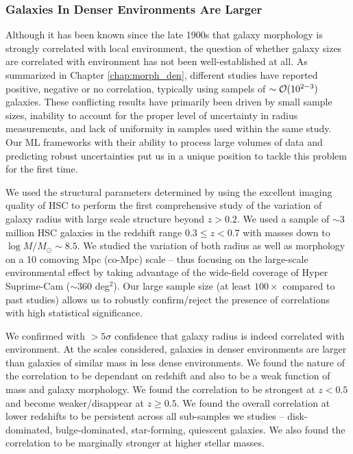 \subsubsection{Galaxies In Denser Environments Are Larger} \label{sec_conc:morph_den} 

Although it has been known since the late 1900s that galaxy morphology is strongly correlated with local environment, the question of whether galaxy sizes are correlated with environment has not been well-established at all. As summarized in Chapter \ref{chap:morph_den}, different studies have reported positive, negative or no correlation, typically using sampels of $\sim \mathcal{O}(10^{2-3})$ galaxies. These conflicting results have primarily been driven by small sample sizes, inability to account for the proper level of uncertainty in radius measurements, and lack of uniformity in samples used within the same study. Our ML frameworks with their ability to process large volumes of data and predicting robust uncertainties put us in a unique position to tackle this problem for the first time. 

We used the structural parameters determined by \gampen{} using the excellent imaging quality of HSC to perform the first comprehensive study of the variation of galaxy radius with large scale structure beyond $z > 0.2$. We used a sample of $\sim3$ million HSC galaxies in the redshift range $0.3 \leq z < 0.7$ with masses down to $\log M/M_{\odot}\sim8.5$. We studied the variation of both radius as well as morphology on a 10 comoving Mpc (co-Mpc) scale -- thus focusing on the large-scale environmental effect by taking advantage of the wide-field coverage of Hyper Suprime-Cam ($\sim 360$ deg$^2$). Our large sample size (at least $100\times$ compared to past studies) allows us to robustly confirm/reject the presence of correlations with high statistical significance. 

We confirmed with $>5\sigma$ confidence that galaxy radius is indeed correlated with environment. At the scales considered, galaxies in denser environments are larger than galaxies of similar mass in less dense environments. We found the nature of the correlation to be dependant on redshift and also to be a weak function of mass and galaxy morphology. We found the correlation to be strongest at $z < 0.5$ and become weaker/disappear at $z \geq 0.5$. We found the overall correlation at lower redshifts to be persistent across all sub-samples we studies -- disk-dominated, bulge-dominated, star-forming, quiescent galaxies. We also found the correlation to be marginally stronger at higher stellar masses. 

